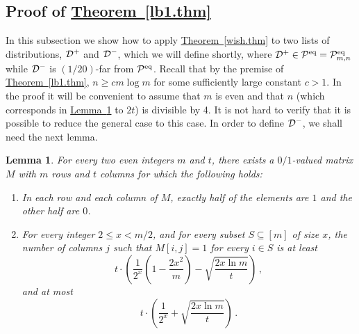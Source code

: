 \documentclass[10pt]{article}
\newtheorem{lemma}[theorem]{Lemma}
\theoremstyle{definition}
\numberwithin{equation}{section}
\newcommand{\expref}[2]{\texorpdfstring{\hyperref[#2]{#1~\ref{#2}}}{#1~\ref{#2}}}
\newcommand{\calD}{{\cal D}}
\newcommand{\BE}{\begin{enumerate}} \newcommand{\EE}{\end{enumerate}}
\newcommand{\calPid}{{\cal P}^{\rm eq}}
\newcommand{\calPidmn}{{\cal P}^{\rm eq}_{m,n}}
\begin{document}
%

\DetailsWish

%


\subsection{Proof of \expref{Theorem}{lb1.thm}}\label{id-lb-proof.subsec}
%
In this subsection we show how to
apply \expref{Theorem}{wish.thm} to two lists of distributions,
$\calD^+$ and $\calD^-$,
which we will define shortly,
where $\calD^+ \in \calPid = \calPidmn$  while
$\calD^-$ is $(1/20)$-far from $\calPid$.
%
Recall that by the premise of \expref{Theorem}{lb1.thm},
%
$n \geq cm\log m$ for some sufficiently large constant $c > 1$.
In the proof it will be convenient to assume that $m$ is even and
that $n$ (which corresponds in \expref{Lemma}{NOT.lem} to $2t$) is divisible by 4. It is not hard to verify that it is
possible to reduce the general case to this case.
%
%
%
In order to define $\calD^-$, we shall need the next lemma.
%
%
\begin{lemma} \label{NOT.lem}
For every two even integers $m$ and $t$,
%
there exists a $0/1$-valued matrix $M$ with $m$ rows and $t$ columns for which the
following holds:
\BE
\item In each row and each column of $M$, exactly half of the elements are $1$ and
the other half are $0$.
\item\sloppy For every integer $2 \leq x < m/2$,
 and for every subset $S \subseteq [m]$ of size $x$,
%
the number of columns $j$ such that $M[i,j] =1$ for every $i \in S$
is at least
\[
t\cdot\left(\frac{1}{2^x}\left(1- \frac{2x^2}{m}\right) -
  \sqrt{\frac{2x\ln m}{t}}\right)\,,
\]
and at most
%
\[
t\cdot\left(\frac{1}{2^x} + \sqrt{\frac{2x\ln m}{t}}\right)\,.
\]
\EE
\end{lemma}
\end{document}
